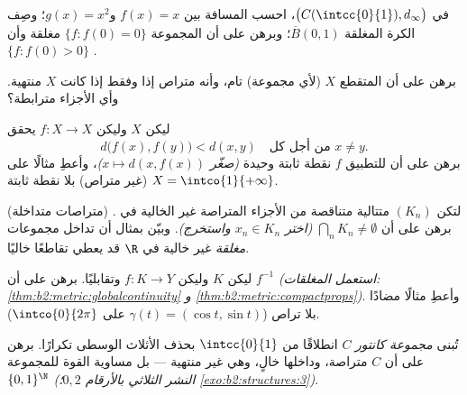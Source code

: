 \begin{exercise}[$\star$]\label{exo:b2:metric:3}
في $\bigl(C(\intcc{0}{1}), d_\infty\bigr)$، احسب المسافة
بين $f(x) = x$ و$g(x) = x^2$؛ وصِف الكرة المغلقة
$\overline B(0, 1)$؛ وبرهن على أن المجموعة $\{f : f(0) = 0\}$
مغلقة وأن $\{f : f(0) > 0\}$ .
\end{exercise}

\begin{exercise}[$\star\star$]\label{exo:b2:metric:4}
برهن على أن  المتقطع $X$ (لأي مجموعة) تام، وأنه
متراص إذا وفقط إذا كانت $X$ منتهية. وأي الأجزاء
مترابطة؟
\end{exercise}

\begin{exercise}[$\star\star$]\label{exo:b2:metric:5}
ليكن $X$  وليكن $f \colon X \to X$ يحقق
\[
d\bigl(f(x), f(y)\bigr) < d(x, y) \quad \text{من أجل كل } x \neq y .
\]
برهن على أن للتطبيق $f$ نقطة ثابتة وحيدة \emph{(صغّر $x \mapsto
d(x, f(x))$)}، وأعطِ مثالًا على $X = \intco{1}{+\infty}$
(غير متراص) بلا نقطة ثابتة.
\end{exercise}

\begin{exercise}[$\star\star$]\label{exo:b2:metric:6}
(متراصات متداخلة) لتكن $(K_n)$ متتالية متناقصة من الأجزاء
المتراصة غير الخالية في . برهن على أن $\bigcap_n K_n \neq
\emptyset$ \emph{(اختر $x_n \in K_n$ واستخرج)}. وبيّن بمثال
أن تداخل مجموعات \emph{مغلقة} غير خالية في $\R$ قد يعطي تقاطعًا
خاليًا.
\end{exercise}

\begin{exercise}[$\star\star$]\label{exo:b2:metric:7}
ليكن $K$  وليكن $f \colon K \to Y$  وتقابليًا.
برهن على أن $f^{-1}$  \emph{(استعمل المغلقات:
\cref{thm:b2:metric:globalcontinuity} و
\cref{thm:b2:metric:compactprops})}. وأعطِ مثالًا مضادًا بلا
تراص ($\gamma(t) = (\cos t, \sin t)$ على
$\intco{0}{2\pi}$).
\end{exercise}

\begin{exercise}[$\star\star$]\label{exo:b2:metric:8}
تُبنى \emph{مجموعة كانتور} $C$ انطلاقًا من $\intcc{0}{1}$ بحذف
الأثلاث الوسطى  تكرارًا. برهن على أن $C$ متراصة،
وداخلها خالٍ، وهي غير منتهية --- بل مساوية القوة للمجموعة
$\{0,1\}^{\N}$ \emph{(النشر الثلاثي بالأرقام $0,2$؛
\cref{exo:b2:structures:3})}.
\end{exercise}

